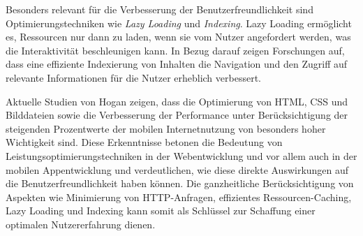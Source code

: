 Besonders relevant für die Verbesserung der Benutzerfreundlichkeit sind Optimierungstechniken wie \emph{Lazy Loading} und \emph{Indexing}. Lazy Loading ermöglicht es, Ressourcen nur dann zu laden, wenn sie vom Nutzer angefordert werden, was die Interaktivität beschleunigen kann. In Bezug darauf zeigen Forschungen auf, dass eine effiziente Indexierung von Inhalten die Navigation und den Zugriff auf relevante Informationen für die Nutzer erheblich verbessert. \cite{sharma2020usability,hogan2014speed,jorgensen1996index,barnum2004index}

Aktuelle Studien von Hogan zeigen, dass die Optimierung von HTML, CSS und Bilddateien sowie die Verbesserung der Performance unter Berücksichtigung der steigenden Prozentwerte der mobilen Internetnutzung von besonders hoher Wichtigkeit sind. Diese Erkenntnisse betonen die Bedeutung von Leistungsoptimierungstechniken in der Webentwicklung und vor allem auch in der mobilen Appentwicklung und verdeutlichen, wie diese direkte Auswirkungen auf die Benutzerfreundlichkeit haben können. Die ganzheitliche Berücksichtigung von Aspekten wie Minimierung von HTTP-Anfragen, effizientes Ressourcen-Caching, Lazy Loading und Indexing kann somit als Schlüssel zur Schaffung einer optimalen Nutzererfahrung dienen. \cite{hogan2014speed}